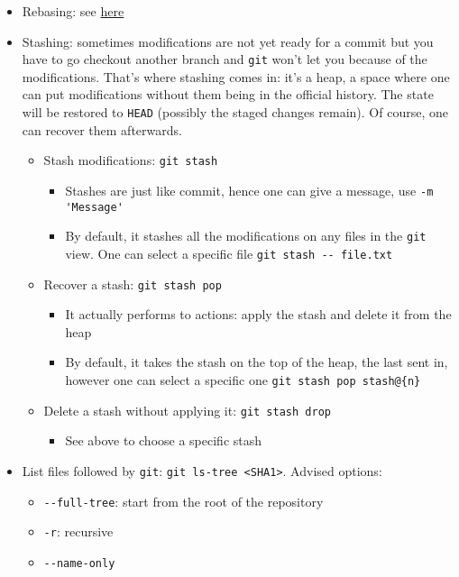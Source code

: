 \documentclass[a4paper,12pt,%
              final%
              ]{article}
\begin{document}
\begin{itemize}
\begin{itemize}
    \end{itemize}
  \item Rebasing: see \href{https://git-scm.com/book/en/v2/Git-Branching-Rebasing}{here}
  \item Stashing: sometimes modifications are not yet ready for a commit but you have to go checkout another branch and \texttt{git} won't let you because of the modifications. That's where stashing comes in: it's a heap, a space where one can put modifications without them being in the official history. The state will be restored to \texttt{HEAD} (possibly the staged changes remain). Of course, one can recover them afterwards.
    \begin{itemize}
      \item Stash modifications: \texttt{git stash}
        \begin{itemize}
          \item Stashes are just like commit, hence one can give a message, use \verb|-m 'Message'|
          \item By default, it stashes all the modifications on any files in the \texttt{git} view. One can select a specific file \verb|git stash -- file.txt|
        \end{itemize}
      \item Recover a stash: \texttt{git stash pop}
        \begin{itemize}
          \item It actually performs to actions: apply the stash and delete it from the heap
          \item By default, it takes the stash on the top of the heap, the last sent in, however one can select a specific one \verb|git stash pop stash@{n}|
        \end{itemize}
      \item Delete a stash without applying it: \texttt{git stash drop}
        \begin{itemize}
          \item See above to choose a specific stash
        \end{itemize}
    \end{itemize}
  \item List files followed by \texttt{git}: \verb|git ls-tree <SHA1>|. Advised options:
    \begin{itemize}
      \item \verb|--full-tree|: start from the root of the repository
      \item \verb|-r|: recursive
      \item \verb|--name-only|

\end{itemize}
\end{itemize}
\end{document}
